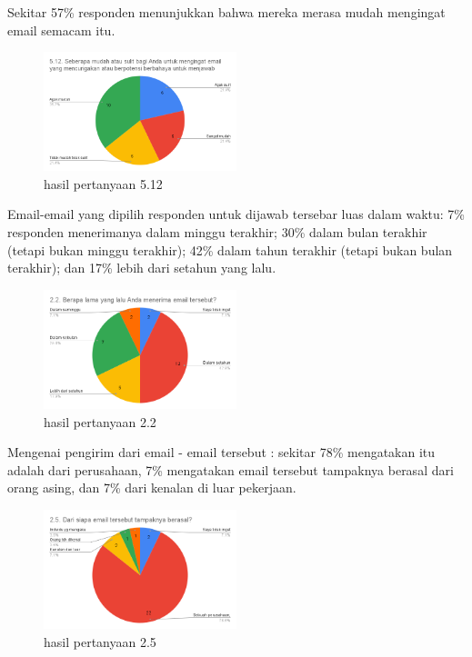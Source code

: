 \documentclass[lettersize,journal]{IEEEtran}
\begin{document}
Sekitar 57\% responden menunjukkan bahwa mereka merasa mudah mengingat email
semacam itu. 

\begin{figure}[h!]
    \centering
    \includegraphics[width=0.5\textwidth]{image/5.12.png} 
    \caption{hasil pertanyaan 5.12}
    \label{fig:pertanyaan_5.12}
\end{figure}

Email-email yang dipilih responden untuk dijawab tersebar luas
dalam waktu: 7\% responden menerimanya dalam minggu terakhir; 30\% dalam bulan
terakhir (tetapi bukan minggu terakhir); 42\% dalam tahun terakhir (tetapi
bukan bulan terakhir); dan 17\% lebih dari setahun yang lalu. 

\begin{figure}[h!]
    \centering
    \includegraphics[width=0.5\textwidth]{image/2.2.png} 
    \caption{hasil pertanyaan 2.2}
    \label{fig:pertanyaan_2.2}
\end{figure}

Mengenai pengirim dari email - email tersebut : sekitar 78\%
mengatakan itu adalah dari perusahaan, 7\% mengatakan email tersebut
tampaknya berasal dari orang asing, dan 7\% dari
kenalan di luar pekerjaan.

\begin{figure}[h!]
    \centering
    \includegraphics[width=0.5\textwidth]{image/2.5.png} 
    \caption{hasil pertanyaan 2.5}
    \label{fig:pertanyaan_2.5}
\end{figure}
\end{document}
